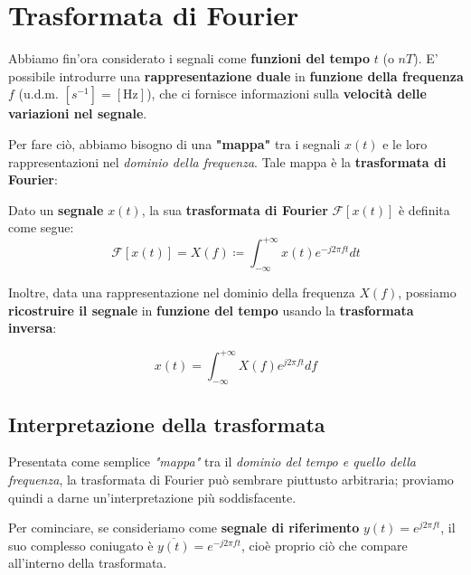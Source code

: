 \chapter{Trasformata di Fourier}

Abbiamo fin'ora considerato i segnali come \textbf{funzioni del tempo} $t$ (o $nT$).
E' possibile introdurre una \textbf{rappresentazione duale} in \textbf{funzione
della frequenza} $f$ (u.d.m. $[s^{-1}]=[\text{Hz}]$), che ci fornisce informazioni
sulla \textbf{velocità delle variazioni nel segnale}.

Per fare ciò, abbiamo bisogno di una \textbf{"mappa"} tra i segnali $x(t)$ e
le loro rappresentazioni nel \textit{dominio della frequenza}. Tale mappa
è la \textbf{trasformata di Fourier}:

\begin{definition}
    Dato un \textbf{segnale} $x(t)$, la sua \textbf{trasformata di Fourier} $\mathcal{F}[x(t)]$ 
    è definita come segue:
    \[
        \mathcal{F}[x(t)] = X(f) \coloneqq \int_{-\infty}^{+\infty} x(t) e^{-j 2\pi ft}dt
    \] 
\end{definition}

Inoltre, data una rappresentazione nel dominio della frequenza $X(f)$, possiamo
\textbf{ricostruire il segnale} in \textbf{funzione del tempo} usando la
\textbf{trasformata inversa}:

\begin{definition}
    \[
        x(t) = \int_{-\infty}^{+\infty} X(f) e^{j 2\pi ft}df
    \] 
\end{definition}

\section{Interpretazione della trasformata}

Presentata come semplice \textit{"mappa"} tra il \textit{dominio del tempo e quello della frequenza},
la trasformata di Fourier può sembrare piuttusto arbitraria; proviamo quindi a darne un'interpretazione
più soddisfacente.

Per cominciare, se consideriamo come \textbf{segnale di riferimento} $y(t)=e^{j 2\pi ft}$, il suo complesso
coniugato è $\overline{y(t)} = e^{-j 2\pi ft}$, cioè proprio ciò che compare all'interno
della trasformata.

